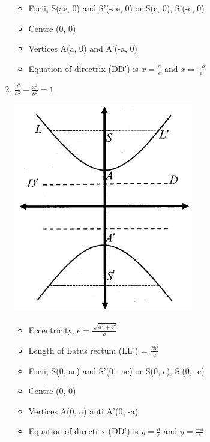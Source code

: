 \documentclass[12pt]{article}
\begin{document}
\begin{multicols}{2}
\begin{enumerate}
\begin{itemize}
        \item Focii, S(ae, 0) and S'(-ae, 0) or S(c, 0), S'(-c, 0)
        \item Centre (0, 0)
        \item Vertices A(a, 0) and A'(-a, 0)
        \item Equation of directrix (DD’) is $x = \frac{a}{e}$ and $x = \frac{-a}{e}$
    \end{itemize}
    \item $\frac{y^{2}}{a^{2}}-\frac{x^{2}}{b^{2}}=1$ \begin{center}
        \includegraphics[scale =0.7]{8.png}
    \end{center}
    \begin{itemize}
        \item Eccentricity, $e = \frac{\sqrt{a^2+b^2}}{a}$
        \item Length of Latus rectum (LL’) = $\frac{2b^2}{a}$
        \item Focii, S(0, ae) and S'(0, -ae) or S(0, c), S'(0, -c)
        \item Centre (0, 0)
        \item Vertices A(0, a) anti A'(0, -a)
        \item Equation of directrix (DD’) is $y =\frac{a}{e}$  and $y = \frac{-a}{e}$
    \end{itemize}

\end{enumerate}
\end{multicols}
\end{document}
